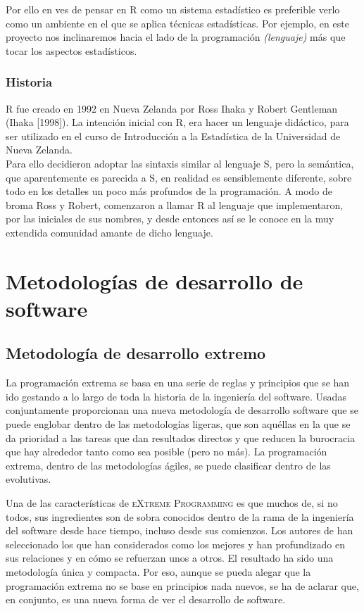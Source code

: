\documentclass[12pt]{book} %
\begin{document}
			Por ello en ves de pensar en R como un sistema estadístico es preferible verlo como un ambiente en el que se aplica técnicas
			estadísticas. Por ejemplo, en este proyecto nos inclinaremos hacia el lado de la programación \textit{(lenguaje)} más que tocar
			los aspectos estadísticos.
			
			\subsubsection{Historia}
			R fue creado en 1992 en Nueva Zelanda por Ross Ihaka y Robert Gentleman (Ihaka [1998]). La intención inicial con R, era hacer 
			un lenguaje didáctico, para ser utilizado en el curso de Introducción a la Estadística de la Universidad de Nueva Zelanda.\\
			Para ello decidieron adoptar las sintaxis similar al lenguaje \textsf{S}, pero la semántica, que aparentemente es parecida a S,
			en realidad es sensiblemente diferente, sobre todo en los detalles un poco más profundos de la programación.
			A modo de broma Ross y Robert, comenzaron a llamar \textsf{R} al lenguaje que implementaron, por las iniciales de sus nombres, 
			y desde entonces así se le conoce en la muy extendida comunidad amante de dicho lenguaje.
		
	
		
\newpage
\section{Metodologías de desarrollo de software}
	
	\subsection{Metodología de desarrollo extremo \label{XP}}
		La programación extrema se basa en una serie de reglas y principios que se han ido gestando a lo largo de toda la historia de la 
		ingeniería del software. Usadas conjuntamente proporcionan una nueva metodología de desarrollo software que se puede englobar dentro
		de las metodologías ligeras, que son aquéllas en la que se da 	prioridad a las tareas que dan resultados directos y que reducen la
		burocracia que hay alrededor tanto como sea posible (pero no más).
		La programación extrema, dentro de las metodologías ágiles, se puede clasificar dentro de las evolutivas.
		
		Una de las características de \textsc{eXtreme Programming} es que muchos de, si no todos, sus ingredientes son de sobra conocidos
		dentro de la rama de la ingeniería del software desde hace tiempo, incluso desde sus comienzos. Los autores de han seleccionado los
		que han considerados como los mejores y han profundizado en sus relaciones y en cómo se refuerzan unos a otros. El resultado ha sido
		una metodología única y compacta. Por eso, aunque se pueda alegar que la programación extrema no se base en	principios nada nuevos,
		se ha de aclarar que, en conjunto, es una nueva forma de ver el desarrollo de software. 
		
\end{document}
